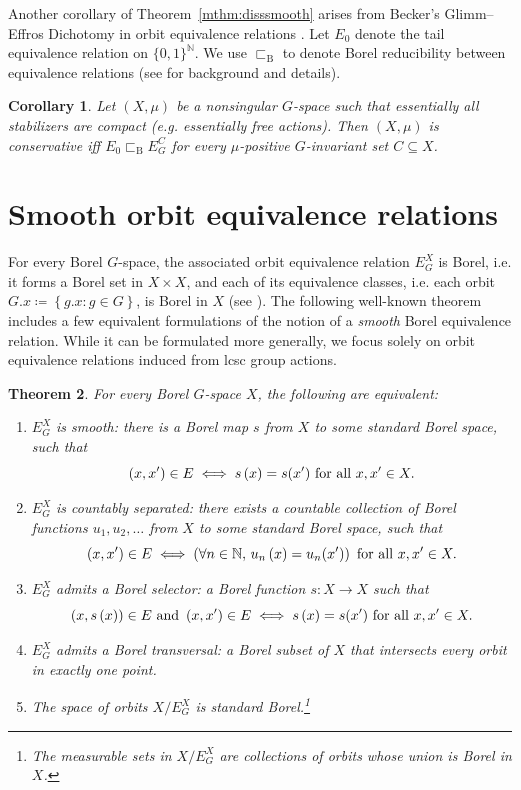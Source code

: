 \documentclass{amsart}
\numberwithin{equation}{subsection}
\newtheorem{thm}{Theorem}[section]
\newtheorem{cor}[thm]{Corollary}
\begin{document}
Another corollary of Theorem~\ref{mthm:disssmooth} arises from Becker's Glimm–Effros Dichotomy in orbit equivalence relations \cite[Theorem 6.5.2]{gao2008invariant}. Let \(E_{0}\) denote the tail equivalence relation on \(\{0,1\}^{\mathbb{N}}\). We use \(\sqsubset_{\mathrm{B}}\) to denote Borel reducibility between equivalence relations (see \cite[\S6]{gao2008invariant} for background and details).

\begin{cor}
Let \(\left(X,\mu\right)\) be a nonsingular \(G\)-space such that essentially all stabilizers are compact (e.g. essentially free actions). Then \(\left(X,\mu\right)\) is conservative iff \(E_{0}\sqsubset_{\mathrm{B}}E_{G}^{C}\) for every \(\mu\)-positive \(G\)-invariant set \(C\subseteq X\).
\end{cor}

\section{Smooth orbit equivalence relations}

For every Borel \(G\)-space, the associated orbit equivalence relation \(E_{G}^{X}\) is Borel, i.e. it forms a Borel set in \(X\times X\), and each of its equivalence classes, i.e. each orbit \(G.x\coloneqq \left\{g.x:g\in G\right\}\), is Borel in \(X\) (see \cite[Exercise 3.4.6, Theorem 3.3.2]{gao2008invariant}). The following well-known theorem includes a few equivalent formulations of the notion of a \emph{smooth} Borel equivalence relation. While it can be formulated more generally, we focus solely on orbit equivalence relations induced from lcsc group actions.

\begin{thm}
\label{thm:smooth}
For every Borel \(G\)-space \(X\), the following are equivalent:
\begin{enumerate}
    \item \(E_{G}^{X}\) is \emph{smooth}: there is a Borel map \(s\) from \(X\) to some standard Borel space, such that
    \[\left(x,x'\right)\in E\iff s\left(x\right)=s\small(x'\small)\text{ for all }x,x'\in X.\] 
    \item \(E_{G}^{X}\) is \emph{countably separated}: there exists a countable collection of Borel functions \(u_{1},u_{2},\dotsc\) from \(X\) to some standard Borel space, such that
    \[\left(x,x'\right)\in E\iff \left(\forall n\in\mathbb{N},\,u_{n}\left(x\right)=u_{n}\small(x'\small)\right)\text{ for all }x,x'\in X.\]
    \item \(E_{G}^{X}\) admits a \emph{Borel selector}: a Borel function \(s:X\to X\) such that
    \[\left(x,s\left(x\right)\right)\in E\text{ and }\left(x,x'\right)\in E\iff s\left(x\right)=s\small(x'\small)\text{ for all }x,x'\in X.\]
    \item \(E_{G}^{X}\) admits a \emph{Borel transversal}: a Borel subset of \(X\) that intersects every orbit in exactly one point.
    \item The space of orbits \(X/E_{G}^{X}\) is standard Borel.\footnote{The measurable sets in \(X/E_{G}^{X}\) are collections of orbits whose union is Borel in \(X\).}
\end{enumerate}
\end{thm}
\end{document}
